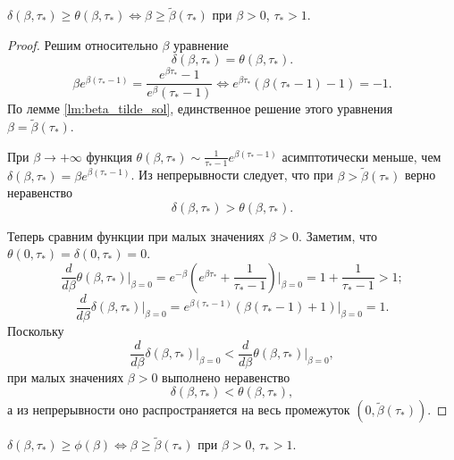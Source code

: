 \begin{proposition}
	\label{prop:delta_theta}
	$\delta(\beta, \tau_*) \geq \theta(\beta, \tau_*) \Leftrightarrow \beta \geq \tilde{\beta}(\tau_*)$ при $\beta > 0$, $\tau_* > 1$.  
\end{proposition}

\begin{proof}
	Решим относительно $\beta$ уравнение 
	\[
	\delta(\beta, \tau_*) = \theta(\beta, \tau_*).
	\]
	\[
	\beta e^{\beta(\tau_*- 1)} = \dfrac{e^{\beta \tau_*} - 1}{e^{\beta} (\tau_* - 1)} \Leftrightarrow e^{\beta\tau_*}(\beta(\tau_* - 1) - 1) = -1.
	\]
	По лемме \ref{lm:beta_tilde_sol}, единственное решение этого уравнения $\beta = \tilde{\beta}(\tau_*)$.
	
	При $\beta \to +\infty$ функция $\theta(\beta, \tau_*) \sim \frac{1}{\tau_* - 1}e^{\beta(\tau_* - 1)}$ асимптотически меньше, чем $\delta(\beta, \tau_*) = \beta e^{\beta (\tau_* - 1)}$. Из непрерывности следует, что при $\beta > \tilde{\beta}(\tau_*)$ верно неравенство
	\[
	\delta(\beta, \tau_*) > \theta(\beta, \tau_*).
	\]
	
	Теперь сравним функции при малых значениях $\beta > 0$. Заметим, что $\theta(0, \tau_*) = \delta(0, \tau_*) = 0$.
	\[
	\frac{d}{d\beta}\theta(\beta, \tau_*)\Bigg\vert_{\beta = 0} = e^{-\beta}\left( e^{\beta \tau_*} + \frac{1}{\tau_* - 1}\right)\Bigg\vert_{\beta = 0} = 1 + \frac{1}{\tau_* - 1} > 1;
	\]
	\[
	\frac{d}{d\beta}\delta(\beta, \tau_*)\Bigg\vert_{\beta = 0} = e^{\beta(\tau_* - 1)}(\beta(\tau_* - 1) + 1)\Bigg\vert_{\beta = 0} = 1.
	\]
	Поскольку
	\[
	\frac{d}{d\beta}\delta(\beta, \tau_*)\bigg\vert_{\beta = 0} < \frac{d}{d\beta}\theta(\beta, \tau_*)\bigg\vert_{\beta = 0},
	\]
	при малых значениях $\beta > 0$ выполнено неравенство
	\[
	\delta(\beta, \tau_*) < \theta(\beta, \tau_*),
	\]
	а из непрерывности оно распространяется на весь промежуток $\left(0, \tilde{\beta}(\tau_*)\right)$.    
\end{proof}


\begin{proposition}
	\label{prop:delta_phi}
	$\delta(\beta, \tau_*) \geq \phi(\beta) \Leftrightarrow \beta \geq \tilde{\beta}(\tau_*)$ при $\beta > 0$, $\tau_* > 1$.  
\end{proposition}

